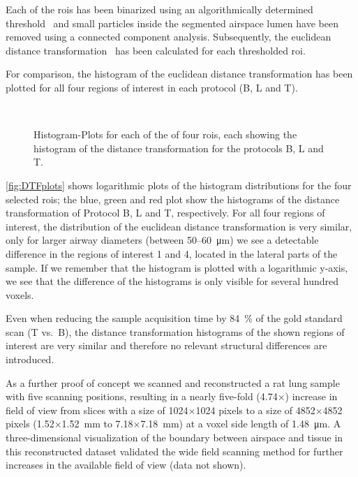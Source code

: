 Each of the \acp{roi} has been binarized using an algorithmically determined threshold~\cite{Otsu1979} and small particles inside the segmented airspace lumen have been removed using a connected component analysis. Subsequently, the euclidean distance transformation~\cite{Danielsson1980} has been calculated for each thresholded \ac{roi}.

For comparison, the histogram of the euclidean distance transformation has been plotted for all four regions of interest in each protocol (B, L and T).

\renewcommand{\imsize}{0.705\linewidth}%
\begin{figure}[htb]%
	\noindent\makebox[\textwidth]{%
		\subfloat{}%
		\subfloat{}%
	}%
	\\%
	\noindent\makebox[\textwidth]{%
		\subfloat{}%
		\subfloat{}%
	}%
	\caption[Histogram-Plots]{Histogram-Plots for each of the of four \acp{roi}, each showing the histogram of the distance transformation for the protocols B, L and T.}%
	\label{fig:DTFplots}
\end{figure}%

\autoref{fig:DTFplots} shows logarithmic plots of the histogram distributions for the four selected \acp{roi}; the blue, green and red plot show the histograms of the distance transformation of Protocol B, L and T, respectively. For all four regions of interest, the distribution of the euclidean distance transformation is very similar, only for larger airway diameters (between 50--\SI{60}{\micro\meter}) we see a detectable difference in the regions of interest 1 and 4, located in the lateral parts of the sample. If we remember that the histogram is plotted with a logarithmic y-axis, we see that the difference of the histograms is only visible for several hundred voxels.

Even when reducing the sample acquisition time by \SI{84}{\percent} of the gold standard scan (T vs.\ B), the distance transformation histograms of the shown regions of interest are very similar and therefore no relevant structural differences are introduced.

As a further proof of concept we scanned and reconstructed a rat lung sample with five scanning positions, resulting in a nearly five-fold (4.74$\times$) increase in field of view from slices with a size of 1024$\times$1024 pixels to a size of 4852$\times$4852 pixels (1.52$\times$\SI{1.52}{\milli\meter} to 7.18$\times$\SI{7.18}{\milli\meter}) at a voxel side length of \SI{1.48}{\micro\meter}. A three-dimensional visualization of the boundary between airspace and tissue in this reconstructed dataset validated the wide field scanning method for further increases in the available field of view (data not shown).


